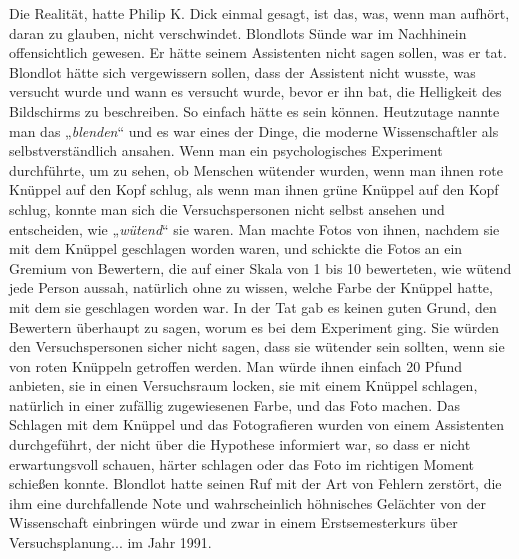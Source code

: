{Die Realität, hatte Philip K. Dick einmal gesagt, ist das, was, wenn man aufhört, daran zu glauben, nicht verschwindet. Blondlots Sünde war im Nachhinein offensichtlich gewesen. Er hätte seinem Assistenten nicht sagen sollen, was er tat. Blondlot hätte sich vergewissern sollen, dass der Assistent nicht wusste, was versucht wurde und wann es versucht wurde, bevor er ihn bat, die Helligkeit des Bildschirms zu beschreiben. So einfach hätte es sein können. Heutzutage nannte man das „\emph{blenden}“ und es war eines der Dinge, die moderne Wissenschaftler als selbstverständlich ansahen. Wenn man ein psychologisches Experiment durchführte, um zu sehen, ob Menschen wütender wurden, wenn man ihnen rote Knüppel auf den Kopf schlug, als wenn man ihnen grüne Knüppel auf den Kopf schlug, konnte man sich die Versuchspersonen nicht selbst ansehen und entscheiden, wie „\emph{wütend}“ sie waren. Man machte Fotos von ihnen, nachdem sie mit dem Knüppel geschlagen worden waren, und schickte die Fotos an ein Gremium von Bewertern, die auf einer Skala von 1 bis 10 bewerteten, wie wütend jede Person aussah, natürlich ohne zu wissen, welche Farbe der Knüppel hatte, mit dem sie geschlagen worden war. In der Tat gab es keinen guten Grund, den Bewertern überhaupt zu sagen, worum es bei dem Experiment ging. Sie würden den Versuchspersonen sicher nicht sagen, dass sie wütender sein sollten, wenn sie von roten Knüppeln getroffen werden. Man würde ihnen einfach 20 Pfund anbieten, sie in einen Versuchsraum locken, sie mit einem Knüppel schlagen, natürlich in einer zufällig zugewiesenen Farbe, und das Foto machen. Das Schlagen mit dem Knüppel und das Fotografieren wurden von einem Assistenten durchgeführt, der nicht über die Hypothese informiert war, so dass er nicht erwartungsvoll schauen, härter schlagen oder das Foto im richtigen Moment schießen konnte. Blondlot hatte seinen Ruf mit der Art von Fehlern zerstört, die ihm eine durchfallende Note und wahrscheinlich höhnisches Gelächter von der Wissenschaft einbringen würde und zwar in einem Erstsemesterkurs über Versuchsplanung... im Jahr 1991.

}
